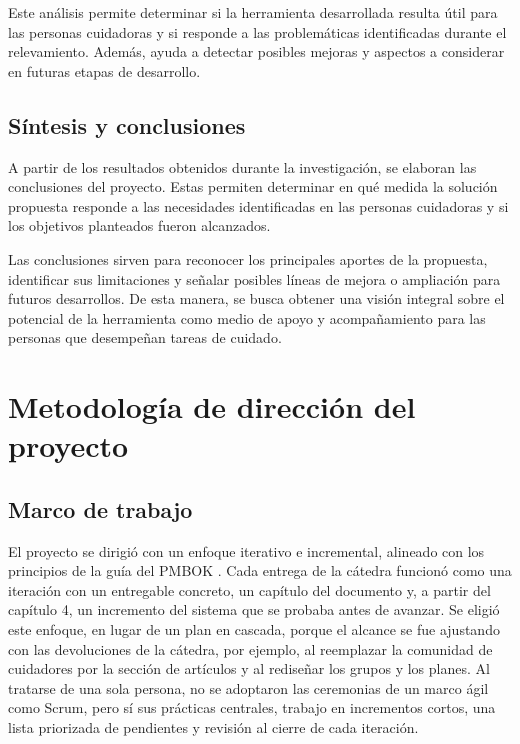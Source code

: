 Este análisis permite determinar si la herramienta desarrollada resulta útil para las personas cuidadoras y si responde a las problemáticas identificadas durante el relevamiento. Además, ayuda a detectar posibles mejoras y aspectos a considerar en futuras etapas de desarrollo.

\subsection{Síntesis y conclusiones}

A partir de los resultados obtenidos durante la investigación, se elaboran las conclusiones del proyecto. Estas permiten determinar en qué medida la solución propuesta responde a las necesidades identificadas en las personas cuidadoras y si los objetivos planteados fueron alcanzados.

Las conclusiones sirven para reconocer los principales aportes de la propuesta, identificar sus limitaciones y señalar posibles líneas de mejora o ampliación para futuros desarrollos. De esta manera, se busca obtener una visión integral sobre el potencial de la herramienta como medio de apoyo y acompañamiento para las personas que desempeñan tareas de cuidado.

\section{Metodología de dirección del proyecto}

\subsection{Marco de trabajo}

El proyecto se dirigió con un enfoque iterativo e incremental, alineado con los principios de la guía del PMBOK \citep{pmi2021}. Cada entrega de la cátedra funcionó como una iteración con un entregable concreto, un capítulo del documento y, a partir del capítulo 4, un incremento del sistema que se probaba antes de avanzar. Se eligió este enfoque, en lugar de un plan en cascada, porque el alcance se fue ajustando con las devoluciones de la cátedra, por ejemplo, al reemplazar la comunidad de cuidadores por la sección de artículos y al rediseñar los grupos y los planes. Al tratarse de una sola persona, no se adoptaron las ceremonias de un marco ágil como Scrum, pero sí sus prácticas centrales, trabajo en incrementos cortos, una lista priorizada de pendientes y revisión al cierre de cada iteración.


